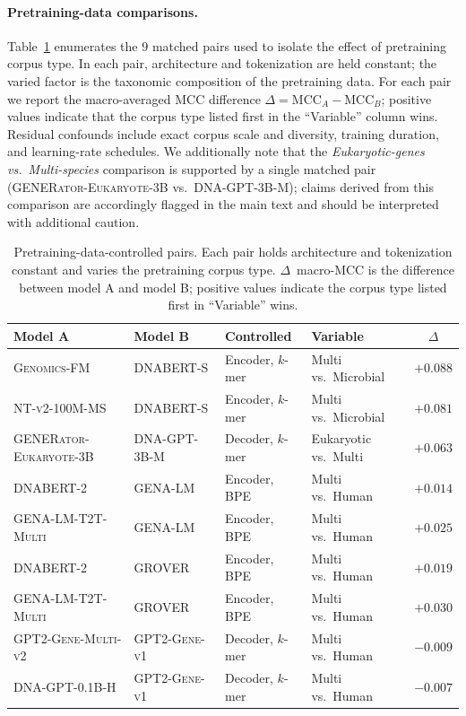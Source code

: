 \documentclass{article}
\theoremstyle{plain}
\theoremstyle{definition}
\theoremstyle{remark}
\begin{document}
\paragraph{Pretraining-data comparisons.}
Table~\ref{tab:pairs_pretraining} enumerates the $9$ matched pairs
used to isolate the effect of pretraining corpus type. In each pair,
architecture and tokenization are held constant; the varied factor is
the taxonomic composition of the pretraining data. For each pair we
report the macro-averaged MCC difference $\Delta = \text{MCC}_A -
\text{MCC}_B$; positive values indicate that the corpus type listed
first in the ``Variable'' column wins. Residual confounds include
exact corpus scale and diversity, training duration, and learning-rate
schedules. We additionally note that the \emph{Eukaryotic-genes vs.\
Multi-species} comparison is supported by a single matched pair
(\textsc{GENERator-Eukaryote-3B} vs.\ \textsc{DNA-GPT-3B-M}); claims
derived from this comparison are accordingly flagged in the main text
and should be interpreted with additional caution.

\begin{table}[h]
\centering
\caption{Pretraining-data-controlled pairs. Each pair holds
architecture and tokenization constant and varies the pretraining
corpus type. $\Delta$~macro-MCC is the difference between model A and
model B; positive values indicate the corpus type listed first in
``Variable'' wins.}
\label{tab:pairs_pretraining}
\small
\begin{tabular}{@{}llllc@{}}
\toprule
\textbf{Model A} & \textbf{Model B} & \textbf{Controlled} & \textbf{Variable} & \textbf{$\Delta$} \\
\midrule
\textsc{Genomics-FM}            & \textsc{DNABERT-S}     & Encoder, $k$-mer  & Multi vs.\ Microbial    & $+0.088$ \\
\textsc{NT-v2-100M-MS}          & \textsc{DNABERT-S}     & Encoder, $k$-mer  & Multi vs.\ Microbial    & $+0.081$ \\
\midrule
\textsc{GENERator-Eukaryote-3B} & \textsc{DNA-GPT-3B-M}  & Decoder, $k$-mer  & Eukaryotic vs.\ Multi   & $+0.063$ \\
\midrule
\textsc{DNABERT-2}              & \textsc{GENA-LM}       & Encoder, BPE      & Multi vs.\ Human        & $+0.014$ \\
\textsc{GENA-LM-T2T-Multi}      & \textsc{GENA-LM}       & Encoder, BPE      & Multi vs.\ Human        & $+0.025$ \\
\textsc{DNABERT-2}              & \textsc{GROVER}        & Encoder, BPE      & Multi vs.\ Human        & $+0.019$ \\
\textsc{GENA-LM-T2T-Multi}      & \textsc{GROVER}        & Encoder, BPE      & Multi vs.\ Human        & $+0.030$ \\
\textsc{GPT2-Gene-Multi-v2}     & \textsc{GPT2-Gene-v1}  & Decoder, $k$-mer  & Multi vs.\ Human        & $-0.009$ \\
\textsc{DNA-GPT-0.1B-H}         & \textsc{GPT2-Gene-v1}  & Decoder, $k$-mer  & Multi vs.\ Human        & $-0.007$ \\
\bottomrule
\end{tabular}
\end{table}
\end{document}
